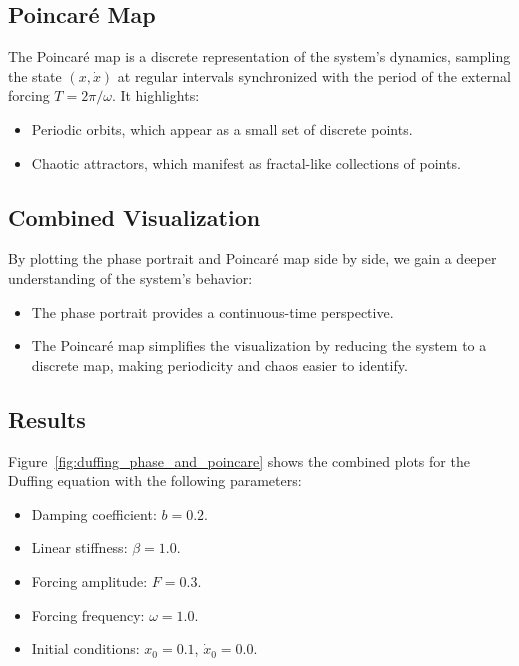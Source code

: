 \documentclass[11pt]{article}
\begin{document}
\subsection*{Poincaré Map}
The Poincaré map is a discrete representation of the system's dynamics, sampling the state \((x, \dot{x})\) at regular intervals synchronized with the period of the external forcing \(T = 2\pi/\omega\). It highlights:
\begin{itemize}
    \item Periodic orbits, which appear as a small set of discrete points.
    \item Chaotic attractors, which manifest as fractal-like collections of points.
\end{itemize}

\subsection*{Combined Visualization}
By plotting the phase portrait and Poincaré map side by side, we gain a deeper understanding of the system's behavior:
\begin{itemize}
    \item The phase portrait provides a continuous-time perspective.
    \item The Poincaré map simplifies the visualization by reducing the system to a discrete map, making periodicity and chaos easier to identify.
\end{itemize}

\subsection*{Results}
Figure~\ref{fig:duffing_phase_and_poincare} shows the combined plots for the Duffing equation with the following parameters:
\begin{itemize}
    \item Damping coefficient: \(b = 0.2\).
    \item Linear stiffness: \(\beta = 1.0\).
    \item Forcing amplitude: \(F = 0.3\).
    \item Forcing frequency: \(\omega = 1.0\).
    \item Initial conditions: \(x_0 = 0.1\), \(\dot{x}_0 = 0.0\).
\end{itemize}
\end{document}
